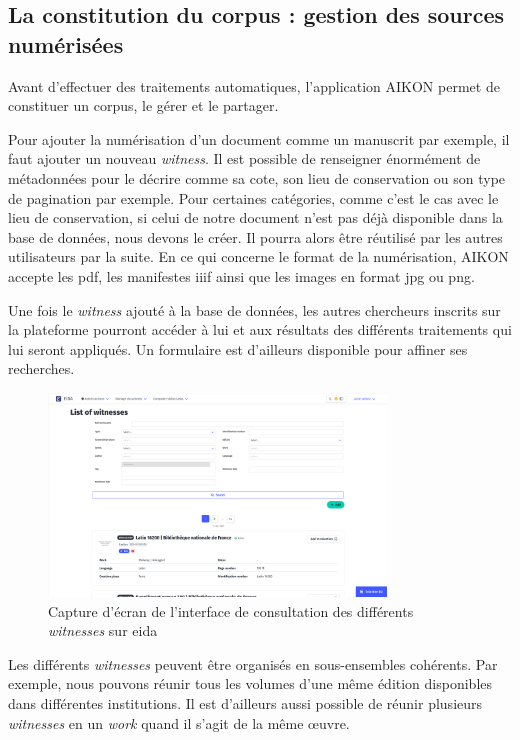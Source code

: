 \subsection{La constitution du corpus : gestion des sources numérisées}

Avant d'effectuer des traitements automatiques, l'application AIKON permet de constituer un corpus, le gérer et le partager. 

Pour ajouter la numérisation d'un document comme un manuscrit par exemple, il faut ajouter un nouveau  \textit{witness}. Il est possible de renseigner énormément de métadonnées pour le décrire comme sa cote, son lieu de conservation ou son type de pagination par exemple. Pour certaines catégories, comme c'est le cas avec le lieu de conservation, si celui de notre document n'est pas déjà disponible dans la base de données, nous devons le créer. Il pourra alors être réutilisé par les autres utilisateurs par la suite. En ce qui concerne le format de la numérisation, AIKON accepte les pdf, les manifestes \gls{iiif} ainsi que les images en format jpg ou png. 

Une fois le \textit{witness} ajouté à la base de données, les autres chercheurs inscrits sur la plateforme pourront accéder à lui et aux résultats des différents traitements qui lui seront appliqués. Un formulaire est d'ailleurs disponible pour affiner ses recherches.

\begin{figure}[H]
	\centering
	\includegraphics[width=0.8\textwidth]{images/list_witnesses.png}
	\caption{Capture d'écran de l'interface de consultation des différents \textit{witnesses} sur \gls{eida}}
	\label{fig:apercu_witnesses}
\end{figure}

Les différents \textit{witnesses} peuvent être organisés en sous-ensembles cohérents. Par exemple, nous pouvons réunir tous les volumes d'une même édition disponibles dans différentes institutions. Il est d'ailleurs aussi possible de réunir plusieurs \textit{witnesses} en un \textit{work} quand il s'agit de la même œuvre.

